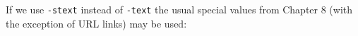 \documentclass{book}
\begin{document}
\bigskip
\ifdefined\HCode
{}
\else
{}
\fi
\bigskip

\noindent If we use \texttt{-stext} instead of \texttt{-text} the usual special values from Chapter 8 (with the exception of URL links) may be used:
\end{document}

